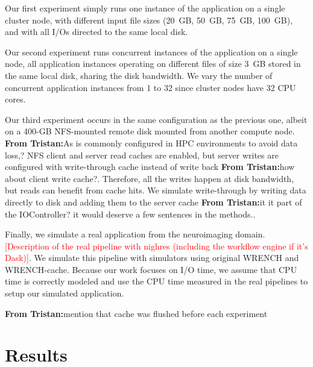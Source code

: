 \documentclass[conference]{IEEEtran}
\newcommand{\tristan}[1]{\color{orange}\textbf{From Tristan:}#1\color{black}}
\begin{document}

            Our first experiment simply runs one instance of the
            application on a single cluster node, with different input file
            sizes (20~GB, 50~GB, 75~GB, 100~GB), and with all I/Os directed
            to the same local disk.

            Our second experiment runs concurrent instances of the
            application on a single node, all application instances
            operating on different files of size 3~GB stored in the same
            local disk, sharing the disk bandwidth. We vary the number of
            concurrent application instances from 1 to 32 since cluster
            nodes have 32 CPU cores.

            Our third experiment occurs in the same configuration as the
            previous one, albeit on a 400-GB NFS-mounted remote disk
            mounted from another compute node. \tristan{As is commonly
            configured in HPC environments to avoid data loss,?} NFS client
            and server read caches are enabled, but server writes are configured with
            write-through cache instead of write back \tristan{how about client write
            cache?}. Therefore, all the writes happen at disk bandwidth, but
            reads can benefit from cache hits. We simulate write-through by
            writing data directly to disk and adding them to the server
            cache \tristan{it it part of the IOController? it would deserve
            a few sentences in the methods.}.

            Finally, we simulate a real application from the neuroimaging
            domain. \textcolor{red}{[Description of the real pipeline with
            nighres (including the workflow engine if it's Dask)]}.
            We simulate this pipeline with simulators using original WRENCH
            and WRENCH-cache. Because our work focuses on I/O time, we
            assume that CPU time is correctly modeled and use the CPU time
            measured in the real pipelines to setup our simulated
            application.

            \tristan{mention that cache was flushed before each experiment}

    \section{Results}
    \label{results}
\end{document}
